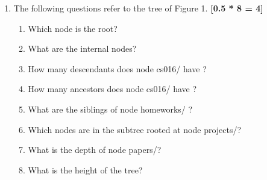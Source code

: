 \documentclass[12pt,a4paper]{article}
\begin{document}
	\begin{enumerate}
		
		\item  The following questions refer to the tree of Figure 1.  \hfill\textbf{[0.5 * 8 = 4] }		
		\begin{enumerate}
			\item Which node is the root?
			\item What are the internal nodes?
			\item  How many descendants does node cs016/ have ? 
			\item How many ancestors does node cs016/ have ?
			\item What are the siblings of node homeworks/ ?
			\item Which nodes are in the subtree rooted at node projects/? 
			\item What is the depth of node papers/?
			\item What is the height of the tree?
		\end{enumerate}
	    

\end{enumerate}
\end{document}
